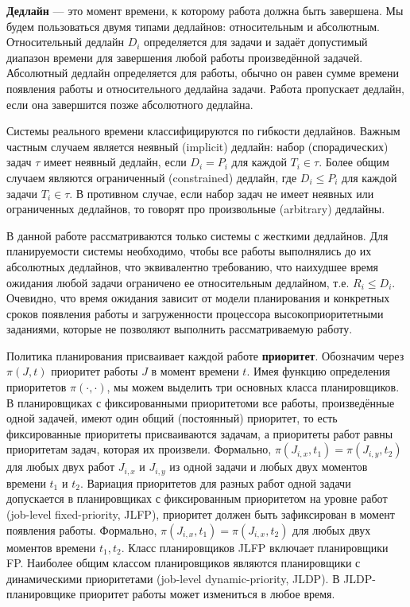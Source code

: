 \documentclass[14pt]{matmex-diploma-custom}
\begin{document}
\textbf{Дедлайн} --- это момент времени, к которому работа должна быть завершена. Мы 
  будем пользоваться двумя типами дедлайнов: относительным и абсолютным. Относительный 
  дедлайн $D_i$ определяется для задачи и задаёт допустимый 
  диапазон времени для завершения любой работы произведённой задачей. Абсолютный дедлайн определяется
  для работы, обычно он равен сумме времени появления работы и относительного дедлайна задачи.
  Работа пропускает дедлайн, если она завершится позже абсолютного дедлайна. 
  
Системы реального времени классифицируются по гибкости дедлайнов. Важным частным случаем 
  является неявный (implicit) дедлайн: набор (спорадических) задач 
  $\tau$ имеет неявный дедлайн, если $D_i = P_i$ для каждой $T_i \in \tau$. Более 
  общим случаем являются ограниченный (constrained) дедлайн, где $D_i \leq P_i$ 
  для каждой задачи $T_i \in \tau$. В противном случае, если набор задач не имеет неявных 
  или ограниченных дедлайнов, то говорят про произвольные (arbitrary) дедлайны. 

В данной работе рассматриваются только системы с жесткими дедлайнов. Для планируемости
  системы необходимо, чтобы все работы выполнялись до их абсолютных дедлайнов, что 
  эквивалентно требованию, что наихудшее время ожидания любой задачи ограничено ее 
  относительным дедлайном, т.е. $R_i \leq D_i$. Очевидно, что время ожидания зависит 
  от модели планирования и конкретных сроков появления работы и 
  загруженности процессора высокоприоритетными заданиями, которые не позволяют 
  выполнить рассматриваемую работу.

Политика планирования присваивает каждой работе \textbf{приоритет}. Обозначим через 
  $\pi (J, t) $ приоритет работы $J$ в момент времени $t$. Имея функцию определения 
  приоритетов $\pi(\cdotp, \cdotp)$, мы можем выделить три основных класса планировщиков. 
  В планировщиках с фиксированными приоритетоми все работы, произведённые одной задачей, 
  имеют один общий (постоянный) приоритет, то есть фиксированные приоритеты присваиваются 
  задачам, а приоритеты работ равны приоритетам задач, которая их произвели. 
  Формально, $\pi(J_{i, x}, t_1) = \pi (J_{i, y}, t_2)$ для любых двух работ $J_{i, x}$ 
  и $J_{i, y}$ из одной задачи и любых двух моментов времени $t_1$ и $t_2$. Вариация 
  приоритетов для разных работ одной задачи допускается в планировщиках с фиксированным 
  приоритетом на уровне работ (job-level fixed-priority, JLFP), приоритет должен 
  быть зафиксирован в момент появления работы.  Формально, $\pi (J_{i, x}, t_1) = \pi (J_{i, x}, t_2)$ 
  для любых двух моментов времени $t_1, t_2$. Класс планировщиков JLFP включает 
  планировщики FP. Наиболее общим классом планировщиков являются планировщики с 
  динамическими приоритетами (job-level dynamic-priority, JLDP). В JLDP-планировщике 
  приоритет работы может измениться в любое время.
\end{document}
